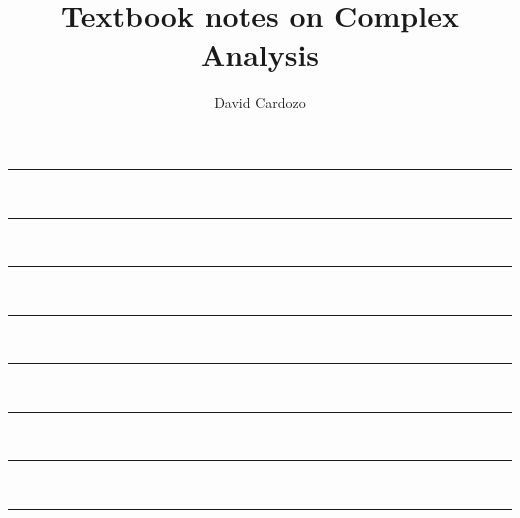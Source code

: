 \documentclass[notitlepage]{article}
\author{David Cardozo}
\title{Textbook notes on Complex Analysis}
\begin{document}





\noindent\rule{\textwidth}{1pt}\\[-0.1cm]



\noindent\rule{\textwidth}{1pt}\\[-0.1cm]



\noindent\rule{\textwidth}{1pt}\\[-0.1cm]



\noindent\rule{\textwidth}{1pt}\\[-0.1cm]



\noindent\rule{\textwidth}{1pt}\\[-0.1cm]



\noindent\rule{\textwidth}{1pt}\\[-0.1cm]



\noindent\rule{\textwidth}{1pt}\\[-0.1cm]

%

\noindent\rule{\textwidth}{1pt}\\[-0.1cm]


\end{document}
